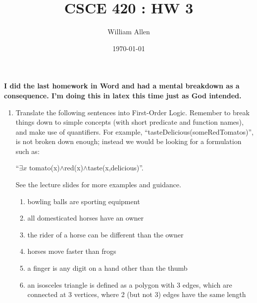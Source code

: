 \documentclass{article}
\title{CSCE 420 : HW 3}
\author{William Allen}
\date{\today}
\theoremstyle{definition}
\newcommand{\<}{\langle}
\renewcommand{\>}{\rangle}
\begin{document}
\maketitle

\textbf{I did the last homework in Word and had a mental breakdown as a consequence. I'm doing this in latex this time just as God intended.}
\begin{enumerate}[label=\textbf{\arabic*.}]
  \item Translate the following sentences into First-Order Logic. Remember to break things down to simple concepts (with short predicate and function names), and make use of quantifiers. For example, “tasteDelicious(someRedTomatos)”, is not broken down enough; instead we would be looking for a formulation such as: 

    “$\exists x$ tomato(x)$\land$red(x)$\land$taste(x,delicious)”. 

    See the lecture slides for more examples and guidance.
    \begin{enumerate}
      \item bowling balls are sporting equipment
      \item all domesticated horses have an owner
      \item the rider of a horse can be different than the owner
      \item horses move faster than frogs
      \item a finger is any digit on a hand other than the thumb
      \item an isosceles triangle is defined as a polygon with 3 edges, which are connected at 3 vertices, where 2 (but not 3) edges have the same length 
    \end{enumerate}
    

\end{enumerate}
\end{document}
